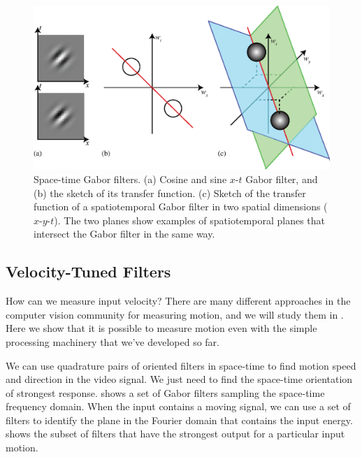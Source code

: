 
\begin{figure}[t]
	\centerline{
		\includegraphics[width=1\linewidth]{figures/temporal_filters/gabor_spacetime_FT.eps}
	}
	\caption{Space-time Gabor filters. (a) Cosine and sine $x$-$t$ Gabor filter, and (b) the sketch of its transfer function. (c) Sketch of the transfer function of a spatiotemporal Gabor filter in two spatial dimensions ($x$-$y$-$t$). The two planes show examples of spatiotemporal planes that intersect the Gabor filter in the same way.}
	\label{fig:spacetimefilts}
\end{figure}

\subsection{Velocity-Tuned Filters}
\label{sect:velocityTunedFilters}

How can we measure input velocity? There are many different approaches in the computer vision community
for measuring motion, and we will study them in \chap{\ref{chapter:motion_estimation}}.  Here we show that it is possible
to measure motion even with the simple processing machinery that
we've developed so far.



We can use quadrature pairs of oriented filters in space-time to find motion
speed and direction in the video signal.  We just need to find the
space-time orientation of strongest response.  shows a set of Gabor filters sampling the space-time frequency domain. When the input contains a moving signal, we can use a set of filters to identify the plane in the Fourier domain that contains the input energy.  shows the subset of filters that have the strongest output for a particular input motion.


